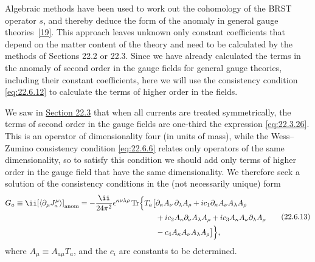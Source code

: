 Algebraic methods have been used to work out the cohomology of the BRST
operator $s$, and thereby deduce the form of the anomaly in general gauge
theories~\hyperref[ch22-ref-19]{[19]}. This approach leaves unknown only
constant coefficients that depend on the matter content of the theory and
need to be calculated by the methods of Sections 22.2 or 22.3. Since we
have already calculated the terms in the anomaly of second order in the
gauge fields for general gauge theories, including their constant
coefficients, here we will use the
consistency condition \eqref{eq:22.6.12} to calculate the terms of higher
order in the fields.

We saw in \hyperref[sec:22.3]{Section 22.3} that when all currents are
treated symmetrically, the terms of second order in the gauge fields are
one-third the expression \eqref{eq:22.3.26}. This is an operator of
dimensionality four (in units of mass), while the Wess--Zumino consistency
condition \eqref{eq:22.6.6} relates only operators of the same
dimensionality, so to satisfy this condition we should add only terms of
higher order in the gauge field that have the same dimensionality. We
therefore seek a solution of the consistency conditions in the (not
necessarily unique) form
\begin{equation}
 \begin{aligned}
 G_a
 \equiv \ii[\langle\partial_\mu J^\mu_a\rangle]_{\rm anom}
 =-\frac{\ii}{24\pi^2}\epsilon^{\kappa\nu\lambda\rho}
 \operatorname{Tr}\Bigl\{T_a\bigl[
 &\partial_\kappa A_\nu\,\partial_\lambda A_\rho
 +ic_1\partial_\kappa A_\nu A_\lambda A_\rho
 \\
 &+ic_2A_\kappa\partial_\nu A_\lambda A_\rho
 +ic_3A_\kappa A_\nu\partial_\lambda A_\rho
 \\
 &-c_4A_\kappa A_\nu A_\lambda A_\rho
 \bigr]\Bigr\},
 \end{aligned}
 \tag{22.6.13}\label{eq:22.6.13}
\end{equation}
where $A_\mu\equiv A_{a\mu}T_a$, and the $c_i$ are constants to
be determined.

